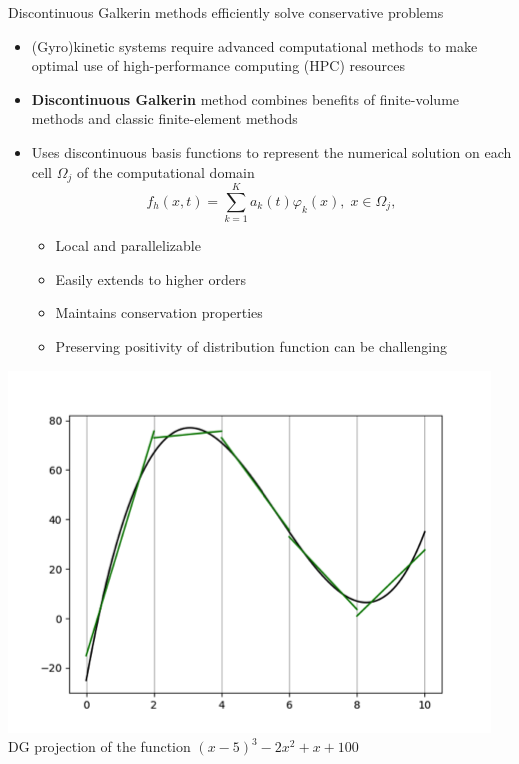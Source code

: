 \documentclass[12pt,table]{beamer}
\begin{document}
\begin{frame}{Discontinuous Galkerin methods efficiently solve conservative problems}
    \begin{itemize} \footnotesize
        \item (Gyro)kinetic systems require advanced computational methods to make optimal use of high-performance computing (HPC) resources
        \item {\bf Discontinuous Galkerin} method combines benefits of finite-volume methods and classic finite-element methods
    \end{itemize}%
    \begin{minipage}{.65\linewidth}
    \begin{itemize} \footnotesize
        \item Uses discontinuous basis functions to represent the numerical solution on each cell $\Omega_j$ of the computational domain
        \vspace{-.2cm}
        \begin{equation*}
            f_{h}(x,t) = \sum_{k=1}^{K} a_k(t) \varphi_k(x), \; x \in \Omega_j,
        \end{equation*}
        \vspace{-.2cm}
        \begin{itemize} \footnotesize
        \item Local and parallelizable
        \item Easily extends to higher orders
        \item Maintains conservation properties 
        \item Preserving positivity of distribution function can be challenging
        \end{itemize}
    \end{itemize}
    \end{minipage}
    \begin{minipage}{.33\linewidth}
    \includegraphics[width=1.1\linewidth,clip,trim=.5cm 0cm 0cm 0cm]{figs/1d-dg.png} \\
    \scriptsize DG projection of the function $(x - 5)^3 - 2x^2 + x + 100$
    \end{minipage}
\end{frame}
\end{document}
